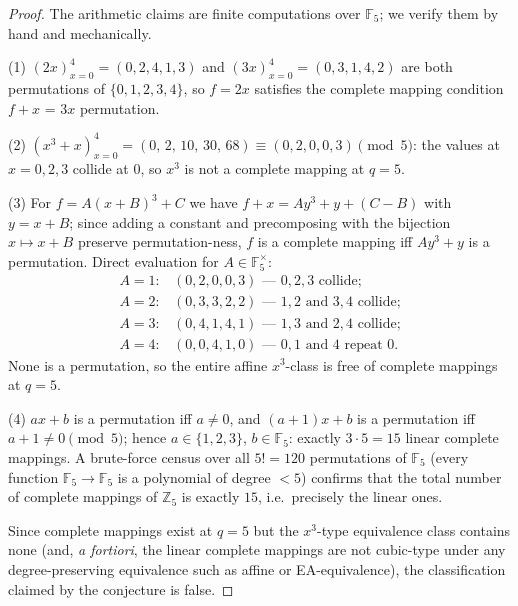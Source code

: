 \documentclass[11pt]{article}
\newcommand{\F}{\mathbb{F}}
\newcommand{\Z}{\mathbb{Z}}
\theoremstyle{plain}
\theoremstyle{remark}
\begin{document}
\begin{proof}
The arithmetic claims are finite computations over $\F_5$; we verify them by
hand and mechanically.

(1) $(2x)_{x=0}^{4} = (0,2,4,1,3)$ and $(3x)_{x=0}^{4} = (0,3,1,4,2)$ are
both permutations of $\{0,1,2,3,4\}$, so $f=2x$ satisfies the complete
mapping condition $f + x$ = $3x$ permutation.

(2) $(x^3+x)_{x=0}^{4} = (0,\,2,\,10,\,30,\,68) \equiv (0,2,0,0,3) \pmod 5$:
the values at $x = 0, 2, 3$ collide at $0$, so $x^3$ is not a complete
mapping at $q = 5$.

(3) For $f = A(x+B)^3 + C$ we have $f + x = A y^3 + y + (C - B)$ with
$y = x + B$; since adding a constant and precomposing with the bijection
$x \mapsto x+B$ preserve permutation-ness, $f$ is a complete mapping iff
$A y^3 + y$ is a permutation. Direct evaluation for $A \in \F_5^\times$:
\[
\begin{array}{ll}
A=1: & (0,2,0,0,3) \text{ --- } 0,2,3 \text{ collide;}\\
A=2: & (0,3,3,2,2) \text{ --- } 1,2 \text{ and } 3,4 \text{ collide;}\\
A=3: & (0,4,1,4,1) \text{ --- } 1,3 \text{ and } 2,4 \text{ collide;}\\
A=4: & (0,0,4,1,0) \text{ --- } 0,1 \text{ and } 4 \text{ repeat } 0.
\end{array}
\]
None is a permutation, so the entire affine $x^3$-class is free of complete
mappings at $q = 5$.

(4) $ax + b$ is a permutation iff $a \neq 0$, and $(a+1)x+b$ is a
permutation iff $a + 1 \neq 0 \pmod 5$; hence $a \in \{1,2,3\}$,
$b \in \F_5$: exactly $3 \cdot 5 = 15$ linear complete mappings. A
brute-force census over all $5! = 120$ permutations of $\F_5$ (every
function $\F_5 \to \F_5$ is a polynomial of degree $< 5$) confirms that the
total number of complete mappings of $\Z_5$ is exactly $15$, i.e.\ precisely
the linear ones.

Since complete mappings exist at $q = 5$ but the $x^3$-type equivalence
class contains none (and, \emph{a fortiori}, the linear complete mappings
are not cubic-type under any degree-preserving equivalence such as affine
or EA-equivalence), the classification claimed by the conjecture is false.
\end{proof}
\end{document}
